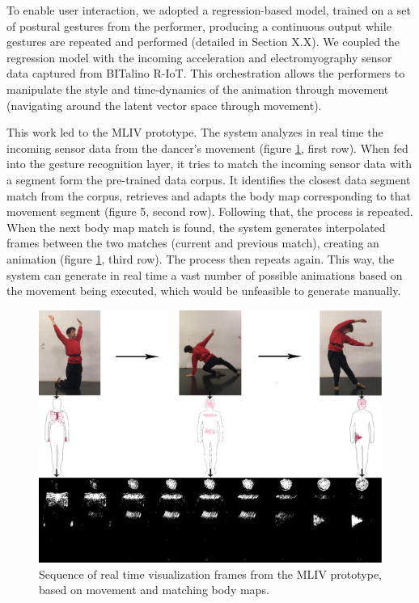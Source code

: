 To enable user interaction, we adopted a regression-based model, trained on a set of postural gestures from the performer, producing a continuous output while gestures are repeated and performed (detailed in Section X.X). We coupled the regression model with the incoming acceleration and electromyography sensor data captured from BITalino R-IoT. This orchestration allows the performers to manipulate the style and time-dynamics of the animation through movement (navigating around the latent vector space through movement).

This work led to the MLIV prototype. The system analyzes in real time the incoming sensor data from the dancer’s movement (figure \ref{fig:ml-screenshot}, first row). When fed into the gesture recognition layer, it tries to match the incoming sensor data with a segment form the pre-trained data corpus. It identifies the closest data segment match from the corpus, retrieves and adapts the body map corresponding to that movement segment (figure 5, second row). Following that, the process is repeated. When the next body map match is found, the system generates interpolated frames between the two matches (current and previous match), creating an animation (figure \ref{fig:ml-screenshot}, third row). The process then repeats again. This way, the system can generate in real time a vast number of possible animations based on the movement being executed, which would be unfeasible to generate manually.

\begin{figure}[ht]
  \centering
  \includegraphics[width=\linewidth]{Chapters/Figures/modi_dis/sensor-drawing-3rows-large.png}
  \caption[Sequence of visualisation frames generated by CAE model]{Sequence of real time visualization frames from the MLIV prototype, based on movement and matching body maps.}
    \label{fig:ml-screenshot}
\end{figure}

